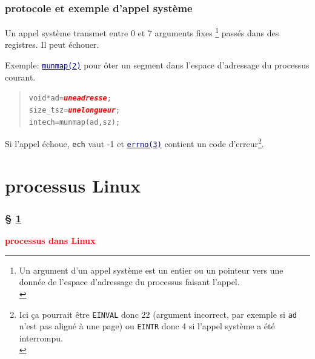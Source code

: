 \documentclass[lualatex,11pt,a4paper,svgnames,french]{beamer}
\newcommand{\clbrougras}[1]{{\textcolor{Red}{\textbf{#1}}}}
\begin{document}
\begin{frame}\frametitle{protocole et exemple d'appel système}
  Un appel système transmet entre 0 et 7 arguments fixes \footnote{Un
  argument d'un appel système est un entier ou un pointeur vers une
  donnée de l'espace d'adressage du processus faisant l'appel.\\} passés
  dans des registres. Il peut échouer.

  Exemple:
  \href{https://man7.org/linux/man-pages/man2/munmap.2.html}{\textcolor{Navy}{\texttt{munmap(2)}}}
  pour ôter un segment dans l'espace d'adressage du processus courant.

  \begin{quote}
  \begin{alltt}
    void* ad = \clbrougras{\textrm{\textit{une adresse}}};\\
    size\_t sz = \clbrougras{\textrm{\textit{une longueur}}};\\
    int ech = munmap(ad, sz);
  \end{alltt}
  \end{quote}
  
  \smallskip
  
  Si l'appel échoue, \texttt{ech} vaut -1 et
  \href{https://man7.org/linux/man-pages/man3/errno.3.html}{\textcolor{Navy}{\texttt{errno(3)}}}
  contient un code d'erreur\footnote{Ici ça pourrait être
  \texttt{EINVAL} donc 22 (argument incorrect, par exemple si
  \texttt{ad} n'est pas aligné à une page) ou \texttt{EINTR} donc 4 si
  l'appel système a été interrompu.\medskip\\}.

  \smallskip
\end{frame}

\section{processus Linux}
\label{sec:process}
\begin{frame}\frametitle{§ \ref{sec:process}}
{\Large \clbrougras{processus dans Linux}}
\end{frame}
\end{document}
